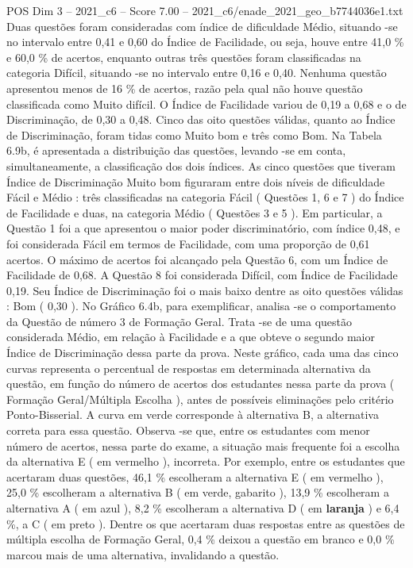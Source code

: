 \begin{textsample}{POS Dim 3 – 2021\_c6 – Score 7.00 – 2021\_c6/enade\_2021\_geo\_b7744036e1.txt}
Duas questões foram consideradas com índice de dificuldade Médio, situando -se no intervalo entre 0,41 e 0,60 do Índice de Facilidade, ou seja, houve entre 41,0 \% e 60,0 \% de acertos, enquanto outras três questões foram classificadas na categoria Difícil, situando -se no intervalo entre 0,16 e 0,40.
Nenhuma questão apresentou menos de 16 \% de acertos, razão pela qual não houve questão classificada como Muito difícil.
O Índice de Facilidade variou de 0,19 a 0,68 e o de Discriminação, de 0,30 a 0,48.
Cinco das oito questões válidas, quanto ao Índice de Discriminação, foram tidas como Muito bom e três como Bom.
Na Tabela 6.9b, é apresentada a distribuição das questões, levando -se em conta, simultaneamente, a classificação dos dois índices.
As cinco questões que tiveram Índice de Discriminação Muito bom figuraram entre dois níveis de dificuldade Fácil e Médio : três classificadas na categoria Fácil ( Questões 1, 6 e 7 ) do Índice de Facilidade e duas, na categoria Médio ( Questões 3 e 5 ).
Em particular, a Questão 1 foi a que apresentou o maior poder discriminatório, com índice 0,48, e foi considerada Fácil em termos de Facilidade, com uma proporção de 0,61 acertos.
O máximo de acertos foi alcançado pela Questão 6, com um Índice de Facilidade de 0,68.
A Questão 8 foi considerada Difícil, com Índice de Facilidade 0,19.
Seu Índice de Discriminação foi o mais baixo dentre as oito questões válidas : Bom ( 0,30 ).
No Gráfico 6.4b, para exemplificar, analisa -se o comportamento da Questão de número 3 de Formação Geral.
Trata -se de uma questão considerada Médio, em relação à Facilidade e a que obteve o segundo maior Índice de Discriminação dessa parte da prova.
Neste gráfico, cada uma das cinco curvas representa o percentual de respostas em determinada alternativa da questão, em função do número de acertos dos estudantes nessa parte da prova ( Formação Geral/Múltipla Escolha ), antes de possíveis eliminações pelo critério Ponto-Bisserial.
A curva em verde corresponde à alternativa B, a alternativa correta para essa questão.
Observa -se que, entre os estudantes com menor número de acertos, nessa parte do exame, a situação mais frequente foi a escolha da alternativa E ( em vermelho ), incorreta.
Por exemplo, entre os estudantes que acertaram duas questões, 46,1 \% escolheram a alternativa E ( em vermelho ), 25,0 \% escolheram a alternativa B ( em verde, gabarito ), 13,9 \% escolheram a alternativa A ( em azul ), 8,2 \% escolheram a alternativa D ( em \textbf{laranja} ) e 6,4 \%, a C ( em preto ).
Dentre os que acertaram duas respostas entre as questões de múltipla escolha de Formação Geral, 0,4 \% deixou a questão em branco e 0,0 \% marcou mais de uma alternativa, invalidando a questão.

\end{textsample}
